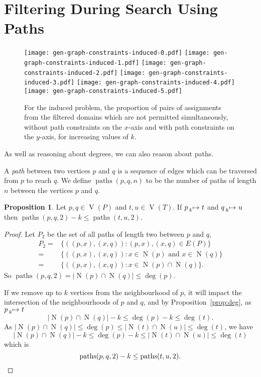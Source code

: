 \documentclass[letterpaper]{article}
\theoremstyle{definition}
\newtheorem{proposition}{Proposition}
\newcommand{\paths}{\operatorname{paths}}
\newcommand{\lessmap}[1]{\prescript{}{#1}{\mapsto}\ }
\newcommand{\V}{\operatorname{V}}
\newcommand{\N}{\operatorname{N}}
\newcommand{\todo}[1]{{\color{red} {?? [}{#1}{]}}}
\begin{document}
\section{Filtering During Search Using Paths}\label{section:pathfiltering}

\begin{figure*}[tb]
    \centering
    \texttt{[image: gen-graph-constraints-induced-0.pdf]}
    \texttt{[image: gen-graph-constraints-induced-1.pdf]}
    \texttt{[image: gen-graph-constraints-induced-2.pdf]}
    \texttt{[image: gen-graph-constraints-induced-3.pdf]}
    \texttt{[image: gen-graph-constraints-induced-4.pdf]}
    \texttt{[image: gen-graph-constraints-induced-5.pdf]}

    \caption{For the induced problem, the proportion of pairs of assignments from the filtered
    domains which are not permitted simultaneously, without path constraints on the $x$-axis and
    with path constraints on the $y$-axis, for increasing values of $k$.}\label{figure:constraints}
\end{figure*}

As well as reasoning about degrees, we can also reason about paths.

A \emph{path} between two vertices $p$ and $q$ is a sequence of edges which can be traversed from $p$ to reach $q$. We define $\paths(p,q,n)$ to be the number of paths of length $n$ between the vertices $p$ and $q$.

\begin{proposition}
    Let $p,q \in \V(P)$ and $t,u\in \V(T)$. If $p \lessmap{k} t$ and $q \lessmap{k} u$ then
     $\paths(p, q, 2) - k \le \paths(t, u, 2)$.
\end{proposition}
\begin{proof}
Let $P_{2}$ be the set of all paths of length two between $p$ and $q$,
\begin{align*}
P_{2} = & \{((p,x),(x,q)) : (p,x),(x,q)\in E(P) \} \\
 = & \{((p,x),(x,q)) : x\in \N(p) \text{ and } x\in \N(q) \} \\
 = & \{((p,x),(x,q)) : x\in \N(p)\cap \N(q) \} .
\end{align*}
So $\paths(p,q,2) = \left| \N(p)\cap \N(q) \right|  \leq \deg(p)$.

If we remove up to $k$ vertices from the neighbourhood of $p$, it will impact the intersection of the neighbourhoods of $p$ and $q$, and by Proposition~\ref{prop:deg}, as $p\lessmap{k}t$
\[
\left| \N(p)\cap \N(q)\right| - k \leq \deg(p) - k \leq \deg(t).
\]
As $\left|\N(p)\cap \N(q)\right|\leq \deg(p) \leq \left|\N(t)\cap \N(u)\right|\leq \deg(t)$, we have
\[
\left|\N(p)\cap \N(q)\right| - k \leq \deg(p) - k\leq \left|\N(t)\cap \N(u)\right|\leq \deg(t)
\]
which is
\[
\paths(p, q, 2) - k \leq \paths(t, u, 2). \qedhere
\]
\end{proof}
\end{document}
